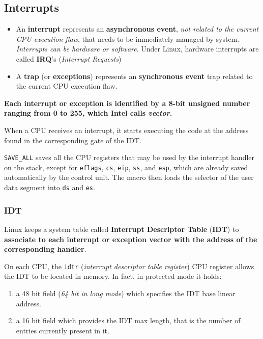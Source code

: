 \documentclass[10pt,a4paper]{article}
\begin{document}
\subsection{Interrupts}

\begin{itemize}

\item An \textbf{interrupt} represents an \textbf{asynchronous event}, \textit{not related to the current CPU execution flaw}, that needs to be immediately managed by system. \textit{Interrupts can be hardware or software}. Under Linux, hardware interrupts are called \textbf{IRQ}'s (\textit{Interrupt Requests})

\item A \textbf{trap} (or \textbf{exceptions}) represents an \textbf{synchronous event} trap related to the current CPU execution flaw. 

\end{itemize}

\textbf{Each interrupt or exception is identified by a 8-bit unsigned number ranging from 0 to 255, which Intel calls \textit{vector}.}

When a CPU receives an interrupt, it starts executing the code at the address found in the corresponding gate of the IDT.

\texttt{SAVE\_ALL} saves all the CPU registers that may be used by the interrupt handler on the
stack, except for \texttt{eflags}, \texttt{cs}, \texttt{eip}, \texttt{ss}, and \texttt{esp}, which are already saved automatically by the control unit. The macro then loads the selector of the user data segment into \texttt{ds} and \texttt{es}.

\subsubsection{IDT}

Linux keeps a system table called \textbf{Interrupt Descriptor Table} (\textbf{IDT}) to \textbf{associate to each interrupt or exception vector with the address of the corresponding handler}. 

On each CPU, the \texttt{idtr} (\textit{interrupt descriptor table register}) CPU register allows the IDT to be located in memory. In fact, in protected mode it holds:
\begin{enumerate}
\item a 48 bit field (\textit{64 bit in long mode}) which specifies the IDT base linear address.
\item a 16 bit field which provides the IDT max length, that is the number of entries currently present in it. 
\end{enumerate}
\end{document}
